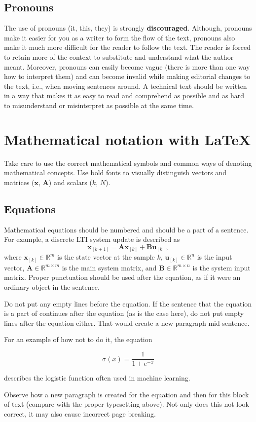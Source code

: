 \subsection{Pronouns}

The use of pronouns (it, this, they) is strongly \textbf{discouraged}.
Although, pronouns make it easier for you as a writer to form the flow of the text, pronouns also make it much more difficult for the reader to follow the text.
The reader is forced to retain more of the context to substitute and understand what the author meant.
Moreover, pronouns can easily become vague (there is more than one way how to interpret them) and can become invalid while making editorial changes to the text, i.e., when moving sentences around.
A technical text should be written in a way that makes it as easy to read and comprehend as possible and as hard to misunderstand or misinterpret as possible at the same time.

\section{Mathematical notation with LaTeX}

Take care to use the correct mathematical symbols and common ways of denoting mathematical concepts.
Use bold fonts to visually distinguish vectors and matrices ($\mathbf{x}$, $\mathbf{A}$) and scalars ($k$, $N$).

\subsection{Equations}
Mathematical equations should be numbered and should be a part of a sentence.
For example, a discrete LTI system update is described as
\begin{equation}
    \mathbf{x}_{\left[k+1\right]} = \mathbf{A}\mathbf{x}_{\left[k\right]} + \mathbf{B}\mathbf{u}_{\left[k\right]},
    \label{eq:lti_system}
\end{equation}
where $\mathbf{x}_{\left[k\right]} \in \mathbb{R}^m$ is the state vector at the sample $k$, $\mathbf{u}_{\left[k\right]} \in \mathbb{R}^n$ is the input vector, $\mathbf{A} \in \mathbb{R}^{m \times m}$ is the main system matrix, and $\mathbf{B} \in \mathbb{R}^{m \times n}$ is the system input matrix.
Proper punctuation should be used after the equation, as if it were an ordinary object in the sentence.

Do not put any empty lines before the equation.
If the sentence that the equation is a part of continues after the equation (as is the case here), do not put empty lines after the equation either.
That would create a new paragraph mid-sentence.
{\color{red}
For an example of how not to do it, the equation

\begin{equation}
    \mathrm{\sigma}(x) = \frac{1}{1 + e^{-x}}
\end{equation}

describes the logistic function often used in machine learning.
}
Observe how a new paragraph is created for the equation and then for this block of text (compare with the proper typesetting above).
Not only does this not look correct, it may also cause incorrect page breaking.

